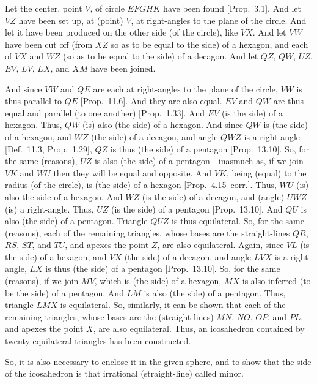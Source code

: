 \begin{Parallel}{}{}
{\epsfysize=3.5in
\centerline{}

Let the center, point $V$, of circle $EFGHK$ have been found [Prop.~3.1]. 
And let $VZ$ have been set up, at (point) $V$,  at right-angles to the plane of the
circle. And let it have been produced on the other side (of the circle), 
like $VX$. And let $VW$ have been cut off 
(from $XZ$ so as to be equal to the side) of a hexagon, and each of $VX$ and 
$WZ$ (so as to be equal to the side) of a decagon. And let
$QZ$,  $QW$, $UZ$, $EV$, $LV$, $LX$, and
$XM$ have been joined.

And since $VW$ and $QE$ are each at right-angles to the plane of the
circle, $VW$ is thus parallel to $QE$ [Prop.~11.6].  And they are also
equal. $EV$ and $QW$ are thus equal and parallel (to one another) [Prop.~1.33]. And $EV$ (is the side) of a hexagon. Thus, $QW$
(is) also (the side) of a hexagon. And since $QW$ is (the side) of a hexagon, 
and $WZ$ (the side) of a decagon, and angle $QWZ$ is a right-angle
[Def.~11.3, Prop.~1.29], 
$QZ$ is thus (the side) of a pentagon [Prop.~13.10]. So, for the same
(reasons), $UZ$ is also (the side) of a pentagon---inasmuch as, if we join
$VK$ and $WU$ then they will be equal and opposite. 
And $VK$, being (equal)
to the radius (of the circle), is (the side) of a hexagon [Prop.~4.15~corr.].
Thus, $WU$ (is) also the side of a hexagon.
 And $WZ$
(is the side) of a decagon, and (angle) $UWZ$ (is) a right-angle. 
Thus, $UZ$ (is the side) of a pentagon [Prop.~13.10]. And $QU$ is
also (the side) of a pentagon. Triangle $QUZ$ is thus equilateral. So,
for the same (reasons), each of the remaining triangles, whose bases
are the straight-lines $QR$, $RS$, $ST$, and $TU$, and apexes the point
$Z$, are also equilateral. Again, since $VL$ (is the side) of a hexagon, and $VX$ (the side) of a decagon, and angle $LVX$ is a right-angle, 
$LX$ is thus (the side) of a pentagon [Prop.~13.10]. So, for the same
(reasons), if we join $MV$, which is (the side) of a hexagon, $MX$
is also inferred (to be the side) of a pentagon. And $LM$ is also (the side)
of a pentagon. Thus, triangle $LMX$ is equilateral. So, similarly,
it can be shown that each of the remaining triangles, whose bases
are the (straight-lines) $MN$, $NO$, $OP$, and $PL$, and apexes the
point $X$,  are also equilateral. Thus, an icosahedron contained by
twenty equilateral triangles has been constructed.

So, it is also necessary to enclose it in the given sphere, and to show
that the side of the icosahedron is that irrational (straight-line) called minor.

}
\end{Parallel}
